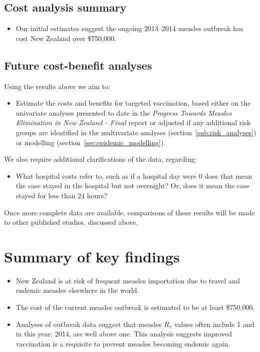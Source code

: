 \documentclass{article}
\begin{document}
\subsection{Cost analysis summary}
\begin{itemize}
\item Our initial estimates suggest the ongoing 2013--2014 measles outbreak has cost New Zealand over \$750,000.
\end{itemize}

\subsection{Future cost-benefit analyses}
Using the results above we aim to:
\begin{itemize}
\item Estimate the costs and benefits for targeted vaccination, based either on the univariate analyses presented to date in the \emph {Progress Towards Measles Elimination in New Zealand - Final} report or adjusted if any additional risk groups are identified in the multivariate analyses (section~\ref{sub:risk_analyses}) or modelling (section~\ref{sec:epidemic_modelling}).
\end{itemize}

We also require additional clarifications of the data, regarding:
\begin {itemize}
\item What hospital costs refer to, such as if a hospital day were 0 does that mean the case stayed in the hospital but not overnight? Or, does it mean the case stayed for less than 24 hours?
\end {itemize}
Once more complete data are available, comparisons of these results will be made to other published studies, discussed above.

\section {Summary of key findings}
\begin{itemize}
\item New Zealand is at risk of frequent measles importation due to travel and endemic measles elsewhere in the world.
\item The cost of the current measles outbreak is estimated to be at least \$750,000.
\item Analyses of outbreak data suggest that measles $R_v$ values often include 1 and in this year, 2014, are well above one. This analysis suggests improved vaccination is a requisite to prevent measles becoming endemic again.
\end{itemize}
\end{document}
